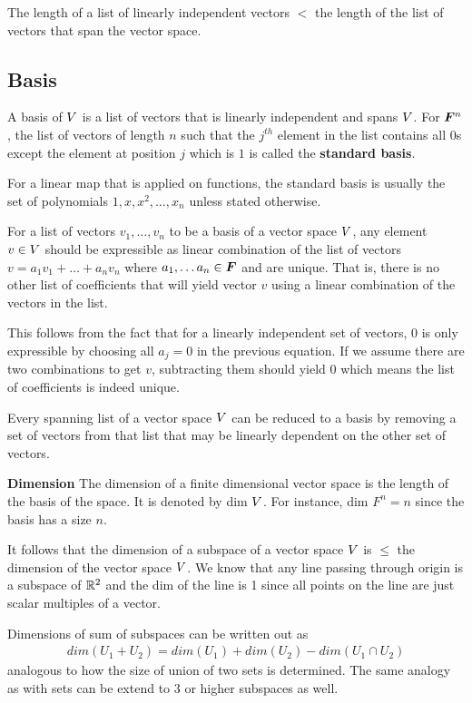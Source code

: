 \documentclass[../../linear_algebra.tex]{subfiles}
\begin{document}
The length of a list of linearly independent vectors $<$ the length of the list of vectors that span the vector space.

\subsection{Basis}
A basis of $V$ is a list of vectors that is linearly independent and spans $V$. For $\bm{F}^{n}$, the list of vectors of length $n$ such that the $j^{th}$ element in the list contains all $0$s except the element at position $j$ which is $1$ is called the \textbf{standard basis}.\newline

For a linear map that is applied on functions, the standard basis is usually the set of polynomials $1, x, x^{2}, \ldots, x_{n}$ unless stated otherwise.\newline

For a list of vectors $v_{1}, \ldots, v_{n}$ to be a basis of a vector space $V$, any element $v \in V$ should be expressible as linear combination of the list of vectors $v = a_{1}v_{1} + \ldots + a_{n}v_{n}$ where $a_{1}, \ldots a_{n} \in \bm{F}$ and are unique. That is, there is no other list of coefficients that will yield vector $v$ using a linear combination of the vectors in the list.\newline

This follows from the fact that for a linearly independent set of vectors, $0$ is only expressible by choosing all $a_{j} = 0$ in the previous equation. If we assume there are two combinations to get $v$, subtracting them should yield $0$ which means the list of coefficients is indeed unique.\newline

Every spanning list of a vector space $V$ can be reduced to a basis by removing a set of vectors from that list that may be linearly dependent on the other set of vectors.\newline

\textbf{Dimension}\newline
The dimension of a finite dimensional vector space is the length of the basis of the space. It is denoted by dim $V$. For instance, dim $F^{n} = n$ since the basis has a size $n$.\newline

It follows that the dimension of a subspace of a vector space $V$ is $\leq$ the dimension of the vector space $V$. We know that any line passing through origin is a subspace of $\mathbb{R}^{2}$ and the dim of the line is 1 since all points on the line are just scalar multiples of a vector.\newline

Dimensions of sum of subspaces can be written out as
\begin{align*}
    dim(U_{1} + U_{2}) = dim(U_{1}) + dim(U_{2}) - dim(U_{1} \cap U_{2})
\end{align*}
analogous to how the size of union of two sets is determined. The same analogy as with sets can be extend to 3 or higher subspaces as well.
\end{document}
